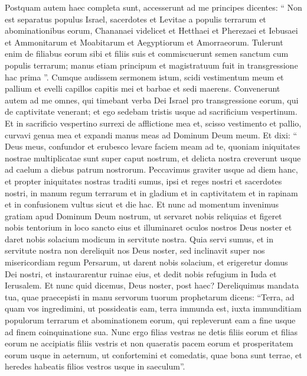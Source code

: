 \begin{biblechapter}
\begin{biblechapter}
\begin{biblechapter}
\begin{biblechapter}
\begin{biblechapter}
\begin{biblechapter}
\begin{biblechapter}
\begin{biblechapter}
\begin{biblechapter}
\verse Postquam autem haec completa sunt, accesserunt ad me principes dicentes: “ Non est separatus populus Israel, sacerdotes et Levitae a populis terrarum et abominationibus eorum, Chananaei videlicet et Hetthaei et Pherezaei et Iebusaei et Ammonitarum et Moabitarum et Aegyptiorum et Amorraeorum. 
\verse Tulerunt enim de filiabus eorum sibi et filiis suis et commiscuerunt semen sanctum cum populis terrarum; manus etiam principum et magistratuum fuit in transgressione hac prima ”. 
\verse Cumque audissem sermonem istum, scidi vestimentum meum et pallium et evelli capillos capitis mei et barbae et sedi maerens. 
\verse Convenerunt autem ad me omnes, qui timebant verba Dei Israel pro transgressione eorum, qui de captivitate venerant; et ego sedebam tristis usque ad sacrificium vespertinum.
 \verse Et in sacrificio vespertino surrexi de afflictione mea et, scisso vestimento et pallio, curvavi genua mea et expandi manus meas ad Dominum Deum meum.
 \verse Et dixi: “ Deus meus, confundor et erubesco levare faciem meam ad te, quoniam iniquitates nostrae multiplicatae sunt super caput nostrum, et delicta nostra creverunt usque ad caelum 
\verse a diebus patrum nostrorum. Peccavimus graviter usque ad diem hanc, et propter iniquitates nostras traditi sumus, ipsi et reges nostri et sacerdotes nostri, in manum regum terrarum et in gladium et in captivitatem et in rapinam et in confusionem vultus sicut et die hac. 
\verse Et nunc ad momentum invenimus gratiam apud Dominum Deum nostrum, ut servaret nobis reliquias et figeret nobis tentorium in loco sancto eius et illuminaret oculos nostros Deus noster et daret nobis solacium modicum in servitute nostra. 
\verse Quia servi sumus, et in servitute nostra non dereliquit nos Deus noster, sed inclinavit super nos misericordiam regum Persarum, ut darent nobis solacium, et erigeretur domus Dei nostri, et instaurarentur ruinae eius, et dedit nobis refugium in Iuda et Ierusalem.
 \verse Et nunc quid dicemus, Deus noster, post haec? Dereliquimus mandata tua, 
 \verse quae praecepisti in manu servorum tuorum prophetarum dicens: “Terra, ad quam vos ingredimini, ut possideatis eam, terra immunda est, iuxta immunditiam populorum terrarum et abominationem eorum, qui repleverunt eam a fine usque ad finem coinquinatione sua. 
\verse Nunc ergo filias vestras ne detis filiis eorum et filias eorum ne accipiatis filiis vestris et non quaeratis pacem eorum et prosperitatem eorum usque in aeternum, ut confortemini et comedatis, quae bona sunt terrae, et heredes habeatis filios vestros usque in saeculum”.

\end{biblechapter}
\end{biblechapter}
\end{biblechapter}
\end{biblechapter}
\end{biblechapter}
\end{biblechapter}
\end{biblechapter}
\end{biblechapter}
\end{biblechapter}
